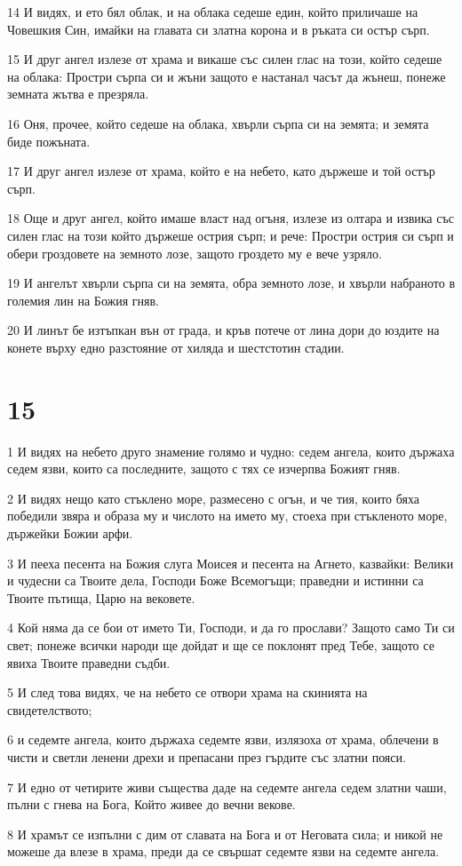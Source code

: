 \par 14 И видях, и ето бял облак, и на облака седеше един, който приличаше на Човешкия Син, имайки на главата си златна корона и в ръката си остър сърп.
\par 15 И друг ангел излезе от храма и викаше със силен глас на този, който седеше на облака: Простри сърпа си и жъни защото е настанал часът да жънеш, понеже земната жътва е презряла.
\par 16 Оня, прочее, който седеше на облака, хвърли сърпа си на земята; и земята биде пожъната.
\par 17 И друг ангел излезе от храма, който е на небето, като държеше и той остър сърп.
\par 18 Още и друг ангел, който имаше власт над огъня, излезе из олтара и извика със силен глас на този който държеше острия сърп; и рече: Простри острия си сърп и обери гроздовете на земното лозе, защото гроздето му е вече узряло.
\par 19 И ангелът хвърли сърпа си на земята, обра земното лозе, и хвърли набраното в големия лин на Божия гняв.
\par 20 И линът бе изтъпкан вън от града, и кръв потече от лина дори до юздите на конете върху едно разстояние от хиляда и шестстотин стадии.

\chapter{15}

\par 1 И видях на небето друго знамение голямо и чудно: седем ангела, които държаха седем язви, които са последните, защото с тях се изчерпва Божият гняв.
\par 2 И видях нещо като стъклено море, размесено с огън, и че тия, които бяха победили звяра и образа му и числото на името му, стоеха при стъкленото море, държейки Божии арфи.
\par 3 И пееха песента на Божия слуга Моисея и песента на Агнето, казвайки: Велики и чудесни са Твоите дела, Господи Боже Всемогъщи; праведни и истинни са Твоите пътища, Царю на вековете.
\par 4 Кой няма да се бои от името Ти, Господи, и да го прослави? Защото само Ти си свет; понеже всички народи ще дойдат и ще се поклонят пред Тебе, защото се явиха Твоите праведни съдби.
\par 5 И след това видях, че на небето се отвори храма на скинията на свидетелството;
\par 6 и седемте ангела, които държаха седемте язви, излязоха от храма, облечени в чисти и светли ленени дрехи и препасани през гърдите със златни пояси.
\par 7 И едно от четирите живи същества даде на седемте ангела седем златни чаши, пълни с гнева на Бога, Който живее до вечни векове.
\par 8 И храмът се изпълни с дим от славата на Бога и от Неговата сила; и никой не можеше да влезе в храма, преди да се свършат седемте язви на седемте ангела.

